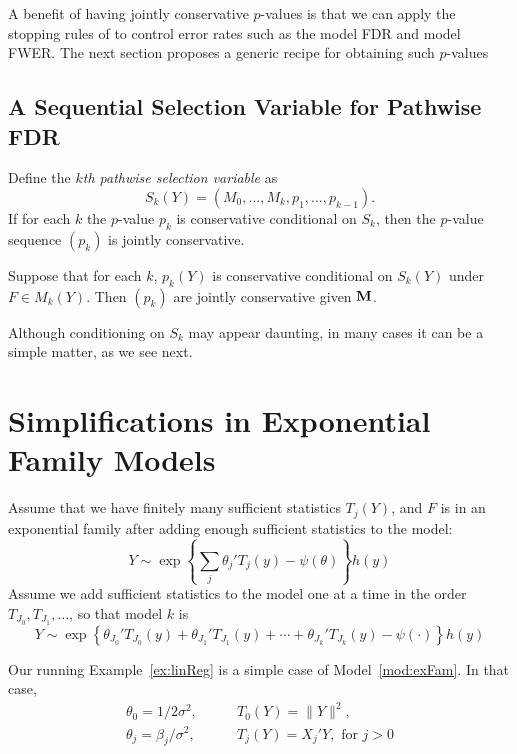 \documentclass{article}
\begin{document}
A  benefit of having jointly conservative $p$-values is that we can apply the stopping rules of \citet{gsell2013sequential} to control error rates such as the model FDR and model FWER. The next section proposes a generic recipe for obtaining such $p$-values

\subsection{A Sequential Selection Variable for Pathwise FDR}

Define the {\em $k$th pathwise selection variable} as 
\begin{equation}
  S_k(Y) = (M_0,\ldots,M_k,p_1,\ldots,p_{k-1}).
\end{equation}
If for each $k$ the $p$-value $p_k$ is conservative conditional on $S_k$, then the $p$-value sequence $(p_k)$ is jointly conservative. 
\begin{proposition}
  Suppose that for each $k$, $p_k(Y)$ is conservative conditional on $S_k(Y)$ under $F\in M_k(Y)$. Then $(p_k)$ are jointly conservative given $\mathbf{M}$.
\end{proposition}

Although conditioning on $S_k$ may appear daunting, in many cases it can be a simple matter, as we see next.

\section{Simplifications in Exponential Family Models}

\begin{model}\label{mod:exFam}
  Assume that we have finitely many sufficient statistics $T_j(Y)$, and $F$ is in an exponential family after adding enough sufficient statistics to the model:
  \begin{equation}
    Y \sim \exp\left\{\sum_j \theta_j ' T_j(y) - \psi(\theta)\right\} h(y)
  \end{equation}
  Assume we add sufficient statistics to the model one at a time in the order $T_{J_0}, T_{J_1}, \ldots$, so that model $k$ is
  \begin{equation}
    Y \sim \exp\left\{\theta_{J_0} ' T_{J_0}(y) + \theta_{J_1}'T_{J_1}(y) + \cdots + \theta_{J_k}'T_{J_k}(y) - \psi(\cdot)\right\} h(y)
  \end{equation}
\end{model}

Our running Example~\ref{ex:linReg} is a simple case of Model~\ref{mod:exFam}. In that case,
\begin{align*}
  \theta_0 = 1/2\sigma^2, &\qquad T_0(Y) = \|Y\|^2,\\
  \theta_j = \beta_j/\sigma^2, &\qquad 
T_j(Y) = X_j'Y, \text{ for } j>0
\end{align*}
\end{document}
